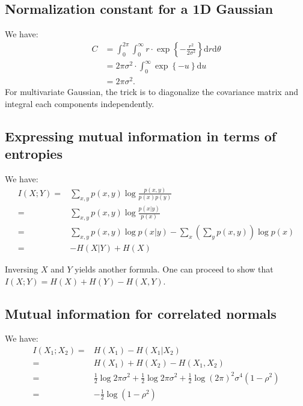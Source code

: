 \documentclass[UTF8]{ctexart}
\begin{document}
\subsection{Normalization constant for a 1D Gaussian}
We have:
$$
\begin{aligned}
C&=\int_{0}^{2\pi}\int_{0}^{\infty}r\cdot\exp\left\{-\frac{r^{2}}{2\sigma^{2}} \right\}\text{d}r\text{d}\theta\\
&=2\pi\sigma^{2}\cdot\int_{0}^{\infty}\exp\left\{-u\right\}\text{d}u\\
&=2\pi\sigma^{2}.
\end{aligned}
$$
For multivariate Gaussian, the trick is to diagonalize the covariance matrix and integral each components independently.


\subsection{Expressing mutual information in terms of entropies}
We have:
\begin{align}
I(X;Y)=&\sum_{x,y}p(x,y) \log \frac{p(x,y)}{p(x)p(y)} \nonumber \\
=&\sum_{x,y}p(x,y)\log \frac{p(x|y)}{p(x)} \nonumber \\
=&\sum_{x,y}p(x,y)\log p(x|y) - \sum_{x}(\sum_{y}p(x,y))\log p(x) \nonumber \\
=&-H(X|Y)+H(X) \nonumber
\end{align}

Inversing $X$ and $Y$ yields another formula.
One can proceed to show that $I(X;Y)=H(X)+H(Y)-H(X,Y)$.

\subsection{Mutual information for correlated normals}
We have:
\begin{align}
I(X_{1};X_{2})=&H(X_{1})-H(X_{1}|X_{2}) \nonumber \\
=&H(X_{1})+H(X_{2})-H(X_{1},X_{2}) \nonumber \\
=&\frac{1}{2}\log 2\pi\sigma^{2}+\frac{1}{2}\log 2\pi\sigma^{2}+\frac{1}{2}\log (2\pi)^{2}\sigma^{4}(1-\rho^{2}) \nonumber \\
=&-\frac{1}{2}\log (1-\rho^{2}) \nonumber
\end{align}
\end{document}
